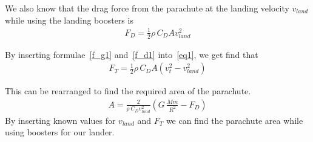 \documentclass[reprint,english,notitlepage]{revtex4-2}
\begin{document}
We also know that the drag force from the parachute at the landing velocity $v_{land}$ while using the landing boosters is
\begin{align}
    F_D = \frac{1}{2}\rho \,C_D A v_{land}^2 \label{f_d1}
\end{align}

By inserting formulae~\ref{f_g1} and~\ref{f_d1} into~\ref{eq1}, we get find that
\begin{align}
    F_T = \frac{1}{2}\rho \,C_D A \left(v_t^2 - v_{land}^2 \right)
\end{align}

This can be rearranged to find the required area of the parachute.
\begin{align}
    A = \frac{2}{\rho \,C_D v_{land}^2}\left( G\,\frac{M m}{R^2} - F_D \right)
\end{align}
By inserting known values for $v_{land}$ and $F_T$ we can find the parachute area while using boosters for our lander.


\newpage
\end{document}
